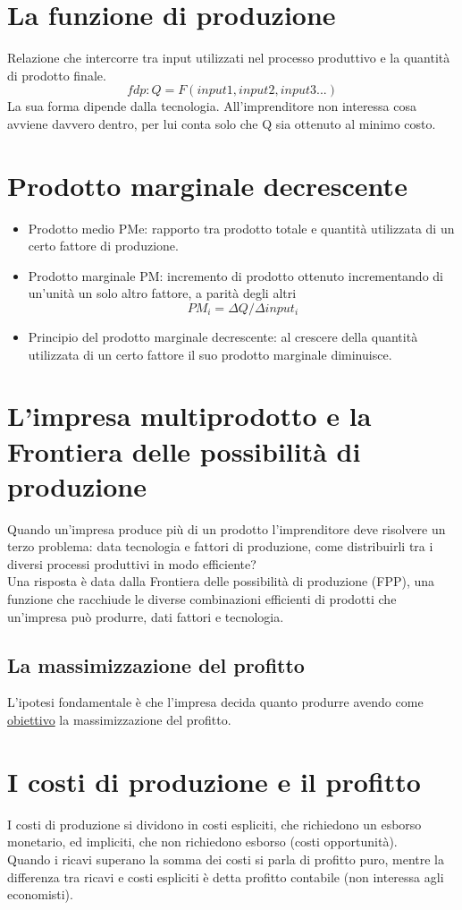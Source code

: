 \documentclass{report}
\begin{document}
	\section{La funzione di produzione}
	Relazione che intercorre tra input utilizzati nel processo produttivo e la quantità di prodotto finale.
	\[ fdp: Q = F(input1, input2, input3 ...) \]
	La sua forma dipende dalla tecnologia. All'imprenditore non interessa cosa avviene davvero dentro, per lui conta solo che Q sia ottenuto al minimo costo.
	\section{Prodotto marginale decrescente}
	\begin{itemize}
		\item Prodotto medio PMe: rapporto tra prodotto totale e quantità utilizzata di un certo fattore di produzione.
		\item Prodotto marginale PM: incremento di prodotto ottenuto incrementando di un'unità un solo altro fattore, a parità degli altri\[ PM_{i} = \Delta Q / \Delta input_{i} \]
		\item Principio del prodotto marginale decrescente: al crescere della quantità utilizzata di un certo fattore il suo prodotto marginale diminuisce.
	\end{itemize}
	\section{L'impresa multiprodotto e la Frontiera delle possibilità di produzione}
	Quando un'impresa produce più di un prodotto l'imprenditore deve risolvere un terzo problema: data tecnologia e fattori di produzione, come distribuirli tra i diversi processi produttivi in modo efficiente?
	\medskip \\
	Una risposta è data dalla Frontiera delle possibilità di produzione (FPP), una funzione che racchiude le diverse combinazioni efficienti di prodotti che un'impresa può produrre, dati fattori e tecnologia.
	\subsection{La massimizzazione del profitto}
	L'ipotesi fondamentale è che l'impresa decida quanto produrre avendo come \underline{obiettivo} la massimizzazione del profitto.
	\section{I costi di produzione e il profitto}
	I costi di produzione si dividono in costi espliciti, che richiedono un esborso monetario, ed impliciti, che non richiedono esborso (costi opportunità).
	\medskip \\
	Quando i ricavi superano la somma dei costi si parla di profitto puro, mentre la differenza tra ricavi e costi espliciti è detta profitto contabile (non interessa agli economisti).
\end{document}
